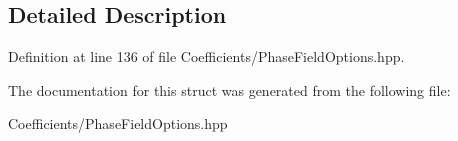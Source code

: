 \subsection{Detailed Description}


Definition at line 136 of file Coefficients/\+Phase\+Field\+Options.\+hpp.



The documentation for this struct was generated from the following file\+:\begin{DoxyCompactItemize}
\item 
Coefficients/\+Phase\+Field\+Options.\+hpp\end{DoxyCompactItemize}
